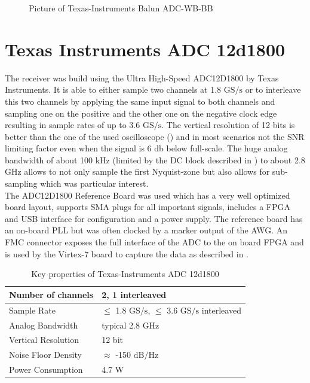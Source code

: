 \begin{figure}[p]
  \centering
  \caption{Picture of Texas-Instruments Balun ADC-WB-BB}
  \label{fig:comp_balun_pic}
\end{figure}

\section{Texas Instruments ADC 12d1800}
\label{sec:comp_adc}
The receiver was build using the Ultra High-Speed ADC12D1800 by Texas Instruments.
It is able to either sample two channels at 1.8 $\text{GS}/\text{s}$ or to interleave
this two channels by applying the same input signal to both channels and sampling
one on the positive and the other one on the negative clock edge resulting in sample
rates of up to 3.6 $\text{GS}/\text{s}$. The vertical resolution of 12 bits is better
than the one of the used oscilloscope () and in most scenarios
not the \gls{SNR} limiting factor even when the signal is 6 db below full-scale.
The huge analog bandwidth of about 100 kHz
(limited by the \gls{DC} block described in ) to about
2.8 GHz allows to not only sample the first Nyquist-zone but also allows
for sub-sampling which was particular interest. \\

The ADC12D1800 Reference Board was used which has a very well optimized board
layout, supports \gls{SMA} plugs for all important signals, includes a
\gls{FPGA} and \gls{USB} interface for configuration and a power supply.
The reference board has an on-board \gls{PLL} but was often clocked by a marker
output of the \gls{AWG}.
An \gls{FMC} connector exposes the full interface of the \gls{ADC} to
the on board \gls{FPGA} and is used by the Virtex-7 board to capture the data
as described in . \\

\begin{table}[h]
  \centering
  \begin{tabular}{|l|l|}
    \hline
    Number of channels & 2, 1 interleaved \\ \hline
    Sample Rate & $\leq$ 1.8 $\text{GS}/\text{s}$, $\leq$ 3.6 $\text{GS}/\text{s}$ interleaved \\ \hline
    Analog Bandwidth & typical 2.8 GHz \\ \hline
    Vertical Resolution & 12 bit \\ \hline
    Noise Floor Density & $\approx$ -150 $\text{dB}/\text{Hz}$ \\ \hline
    Power Consumption & 4.7 W \\ \hline
  \end{tabular}
  \caption{Key properties of Texas-Instruments ADC 12d1800 \cite{ti_adc12d1800}}
  \label{tab:comp_adc}
\end{table}

